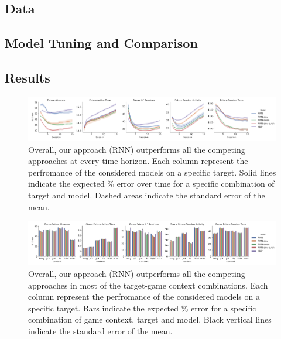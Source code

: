 \subsection{Data}
\label{data_3}




\lorem

\subsection{Model Tuning and Comparison}
\label{tuning_comparison_3}
\lorem

\subsection{Results}
\label{results_3}
\lorem
\begin{figure}[h]
\centering
\includegraphics[width=\textwidth]{images/chapter_3/models_comparison_collapsed_game_33.png}
\caption[\textbf{Model comparison collapsing over game context}]{ Overall, our approach (RNN) outperforms all the competing approaches at every time horizon. Each column represent the perfromance of the considered models on a specific target. Solid lines indicate the expected \% error over time for a specific combination of target and model. Dashed areas indicate the standard error of the mean.}
\label{model_comp_coll_game_33}
\end{figure}
\lorem
\begin{figure}[h]
\centering
\includegraphics[width=\textwidth]{images/chapter_3/models_comparison_collapsed_time_33.png}
\caption[\textbf{Model comparison collapsing over time}]{ Overall, our approach (RNN) outperforms all the competing approaches in most of the target-game context combinations. Each column represent the perfromance of the considered models on a specific target. Bars indicate the expected \% error for a specific combination of game context, target and model. Black vertical lines indicate the standard error of the mean.}
\label{model_comp_coll_time_33} 
\end{figure}

